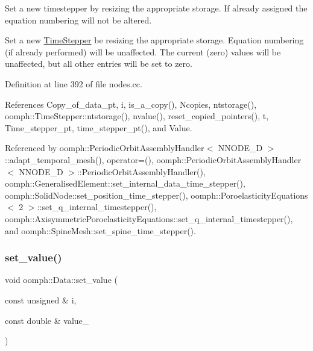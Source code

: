 Set a new timestepper by resizing the appropriate storage. If already assigned the equation numbering will not be altered. 

Set a new \hyperlink{classoomph_1_1TimeStepper}{Time\+Stepper} be resizing the appropriate storage. Equation numbering (if already performed) will be unaffected. The current (zero) values will be unaffected, but all other entries will be set to zero. 

Definition at line 392 of file nodes.\+cc.



References Copy\+\_\+of\+\_\+data\+\_\+pt, i, is\+\_\+a\+\_\+copy(), Ncopies, ntstorage(), oomph\+::\+Time\+Stepper\+::ntstorage(), nvalue(), reset\+\_\+copied\+\_\+pointers(), t, Time\+\_\+stepper\+\_\+pt, time\+\_\+stepper\+\_\+pt(), and Value.



Referenced by oomph\+::\+Periodic\+Orbit\+Assembly\+Handler$<$ N\+N\+O\+D\+E\+\_\+D $>$\+::adapt\+\_\+temporal\+\_\+mesh(), operator=(), oomph\+::\+Periodic\+Orbit\+Assembly\+Handler$<$ N\+N\+O\+D\+E\+\_\+D $>$\+::\+Periodic\+Orbit\+Assembly\+Handler(), oomph\+::\+Generalised\+Element\+::set\+\_\+internal\+\_\+data\+\_\+time\+\_\+stepper(), oomph\+::\+Solid\+Node\+::set\+\_\+position\+\_\+time\+\_\+stepper(), oomph\+::\+Poroelasticity\+Equations$<$ 2 $>$\+::set\+\_\+q\+\_\+internal\+\_\+timestepper(), oomph\+::\+Axisymmetric\+Poroelasticity\+Equations\+::set\+\_\+q\+\_\+internal\+\_\+timestepper(), and oomph\+::\+Spine\+Mesh\+::set\+\_\+spine\+\_\+time\+\_\+stepper().

\mbox{\label{classoomph_1_1Data_a7289ca322725c6fd493970a19474b382}} 
\subsubsection{\texorpdfstring{set\+\_\+value()}{set\_value()}\hspace{0.1cm}{\footnotesize\ttfamily [1/2]}}
{\footnotesize\ttfamily void oomph\+::\+Data\+::set\+\_\+value (\begin{DoxyParamCaption}\item[{const unsigned \&}]{i,  }\item[{const double \&}]{value\+\_\+ }\end{DoxyParamCaption})\hspace{0.3cm}{\ttfamily [inline]}}



